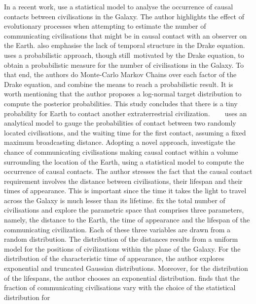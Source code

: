 \documentclass[crop]{CSLB}
\begin{document}
In a recent work, \citep{balbi_impact_2018} use a statistical model to
analyse the occurrence of causal contacts between civilisations in the
Galaxy.
%
The author highlights the effect of evolutionary processes when
attempting to estimate the number of communicating civilisations that
might be in causal contact with an observer on the Earth.
%
\citet{cirkovic_temporal_2004} also emphasise the lack of temporal
structure in the Drake equation.
%
\citet{bloetscher_using_2019} uses a probabilistic approach, though
still motivated by the Drake equation, to obtain a probabilistic
measure for the number of civilisations in the Galaxy.
%
To that end, the authors do Monte-Carlo Markov Chains over each factor
of the Drake equation, and combine the means to reach a probabilistic
result.
%
It is worth mentioning that the author proposes a log-normal target
distribution to compute the posterior probabilities.
%
This study concludes that there is a tiny probability for Earth to
contact another extraterrestrial civilization.    
%
\citet{smith_broadcasting_2009} uses an analytical model to gauge the
probabilities of contact between two randomly located civilisations,
and the waiting time for the first contact, assuming a fixed maximum
broadcasting distance.
% 
Adopting a novel approach, \citet{balbi_impact_2018} investigate the
chance of communicating civilisations making causal contact within a
volume surrounding the location of the Earth, using a statistical
model to compute the occurrence of causal contacts.
%
The author stresses the fact that the causal contact requirement
involves the distance between civilisations, their lifespan and their
times of appearance. This is important since the time it takes the
light to travel across the Galaxy is much lesser than its lifetime.
%
\citet{balbi_impact_2018} fix the total number of civilisations and
explore the parametric space that comprises three parameters, namely,
the distance to the Earth, the time of appearance and the lifespan of
the communicating civilization.
%
Each of these three variables are drawn from a random distribution.
%
The distribution of the distances results from a uniform model for the
positions of civilizations within the plane of the Galaxy.
%
For the distribution of the characteristic time of appearance, the
author explores exponential and truncated Gaussian distributions.
%
Moreover, for the distribution of the lifespans, the author chooses an
exponential distribution.
%
\citet{balbi_impact_2018} finds that the fraction of communicating
civilisations vary with the choice of the statistical distribution for
\end{document}
